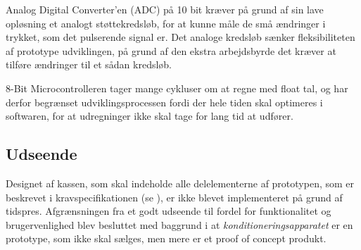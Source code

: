 Analog Digital Converter'en (ADC) på 10 bit kræver på grund af sin lave opløsning et analogt støttekredsløb, for at kunne måle de små ændringer i trykket, som det pulserende signal er. Det analoge kredsløb sænker fleksibiliteten af prototype udviklingen, på grund af den ekstra arbejdsbyrde det kræver at tilføre ændringer til et sådan kredsløb.

8-Bit Microcontrolleren tager mange cykluser om at regne med float tal, og har derfor begrænset udviklingsprocessen fordi der hele tiden skal optimeres i softwaren, for at udregninger ikke skal tage for lang tid at udfører.


\subsection{Udseende}
Designet af kassen, som skal indeholde alle delelementerne af prototypen, som er beskrevet i kravspecifikationen (se ), er ikke blevet implementeret på grund af tidspres. Afgrænsningen fra et godt udseende til fordel for funktionalitet og brugervenlighed blev besluttet med baggrund i at \textit{konditioneringsapparatet} er en prototype, som ikke skal sælges, men mere er et proof of concept produkt. 

